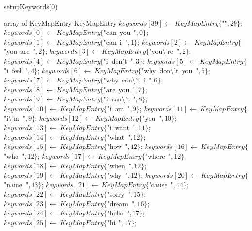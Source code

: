 \documentclass[a4paper,10pt]{article}
\begin{document}
\begin{algorithm}
\caption{setupKeywords(0)}
\begin{algorithmic}[5]
\State {}
\State {}
\State {}
    \State array of KeyMapEntry
  \EndDecl
    \State KeyMapEntry
  \EndDecl
  \State \(keywords[39]\gets\ KeyMapEntry\{\)"{}"{}\(,29\}\);
  \State \(keywords[0]\gets\ KeyMapEntry\{\)"{}can\ you\ "{}\(,0\}\);
  \State \(keywords[1]\gets\ KeyMapEntry\{\)"{}can\ i\ "{}\(,1\}\);
  \State \(keywords[2]\gets\ KeyMapEntry\{\)"{}you\ are\ "{}\(,2\}\);
  \State \(keywords[3]\gets\ KeyMapEntry\{\)"{}you\textbackslash{}'{}re\ "{}\(,2\}\);
  \State \(keywords[4]\gets\ KeyMapEntry\{\)"{}i\ don'{}t\ "{}\(,3\}\);
  \State \(keywords[5]\gets\ KeyMapEntry\{\)"{}i\ feel\ "{}\(,4\}\);
  \State \(keywords[6]\gets\ KeyMapEntry\{\)"{}why\ don\textbackslash{}'{}t\ you\ "{}\(,5\}\);
  \State \(keywords[7]\gets\ KeyMapEntry\{\)"{}why\ can\textbackslash{}'{}t\ i\ "{}\(,6\}\);
  \State \(keywords[8]\gets\ KeyMapEntry\{\)"{}are\ you\ "{}\(,7\}\);
  \State \(keywords[9]\gets\ KeyMapEntry\{\)"{}i\ can\textbackslash{}'{}t\ "{}\(,8\}\);
  \State \(keywords[10]\gets\ KeyMapEntry\{\)"{}i\ am\ "{}\(,9\}\);
  \State \(keywords[11]\gets\ KeyMapEntry\{\)"{}i\textbackslash{}'{}m\ "{}\(,9\}\);
  \State \(keywords[12]\gets\ KeyMapEntry\{\)"{}you\ "{}\(,10\}\);
  \State \(keywords[13]\gets\ KeyMapEntry\{\)"{}i\ want\ "{}\(,11\}\);
  \State \(keywords[14]\gets\ KeyMapEntry\{\)"{}what\ "{}\(,12\}\);
  \State \(keywords[15]\gets\ KeyMapEntry\{\)"{}how\ "{}\(,12\}\);
  \State \(keywords[16]\gets\ KeyMapEntry\{\)"{}who\ "{}\(,12\}\);
  \State \(keywords[17]\gets\ KeyMapEntry\{\)"{}where\ "{}\(,12\}\);
  \State \(keywords[18]\gets\ KeyMapEntry\{\)"{}when\ "{}\(,12\}\);
  \State \(keywords[19]\gets\ KeyMapEntry\{\)"{}why\ "{}\(,12\}\);
  \State \(keywords[20]\gets\ KeyMapEntry\{\)"{}name\ "{}\(,13\}\);
  \State \(keywords[21]\gets\ KeyMapEntry\{\)"{}cause\ "{}\(,14\}\);
  \State \(keywords[22]\gets\ KeyMapEntry\{\)"{}sorry\ "{}\(,15\}\);
  \State \(keywords[23]\gets\ KeyMapEntry\{\)"{}dream\ "{}\(,16\}\);
  \State \(keywords[24]\gets\ KeyMapEntry\{\)"{}hello\ "{}\(,17\}\);
  \State \(keywords[25]\gets\ KeyMapEntry\{\)"{}hi\ "{}\(,17\}\);

\end{algorithmic}
\end{algorithm}
\end{document}
